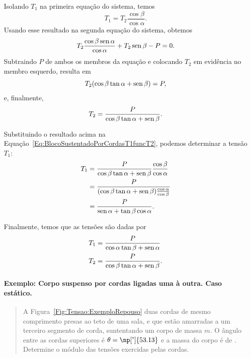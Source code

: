 \noindent{}Isolando $T_1$ na primeira equação do sistema, temos
\begin{equation}\label{Eq:BlocoSustentadoPorCordasT1funcT2}
    T_1 = T_2 \frac{\cos\beta}{\cos\alpha}.
\end{equation}
%
Usando esse resultado na segunda equação do sistema, obtemos
\begin{equation}
    T_2 \frac{\cos\beta\operatorname{sen}\alpha}{\cos\alpha} + T_2\operatorname{sen}\beta - P = 0.
\end{equation}
%
Subtraindo $P$ de ambos os membros da equação e colocando $T_2$ em evidência no membro esquerdo, resulta em
\begin{equation}
    T_2 (\cos\beta\tan\alpha + \operatorname{sen}\beta) = P,
\end{equation}
%
e, finalmente,
\begin{equation}
    T_2 = \frac{P}{\cos\beta\tan\alpha + \operatorname{sen}\beta}.
\end{equation}

Substituindo o resultado acima na Equação~\eqref{Eq:BlocoSustentadoPorCordasT1funcT2}, podemos determinar a tensão $T_1$:
\begin{align}
    T_1 &= \frac{P}{\cos\beta\tan\alpha + \operatorname{sen}\beta} \frac{\cos\beta}{\cos\alpha} \\
    &= \frac{P}{(\cos\beta\tan\alpha + \operatorname{sen}\beta)\frac{\cos\alpha}{\cos\beta}} \\
    &=\frac{P}{\operatorname{sen}\alpha + \tan\beta\cos\alpha}.
\end{align}

\noindent{}Finalmente, temos que as tensões são dadas por
\begin{align}
    T_1 &= \frac{P}{\cos\alpha\tan\beta + \operatorname{sen}\alpha}\\
    T_2 &= \frac{P}{\cos\beta\tan\alpha + \operatorname{sen}\beta}.
\end{align}

\paragraph{Exemplo: Corpo suspenso por cordas ligadas uma à outra. Caso estático.}

\begin{quote}
    A Figura~\ref{Fig:Tensao:ExemploRepouso} duas cordas de mesmo comprimento presas ao teto de uma sala, e que estão amarradas a um terceiro segmento de corda, suntentando um corpo de massa $m$. O ângulo entre as cordas superiores é $\theta = \np[\tcdegree]{53.13}$ e a massa do corpo é de . Determine o módulo das tensões exercidas pelas cordas.
\end{quote}

